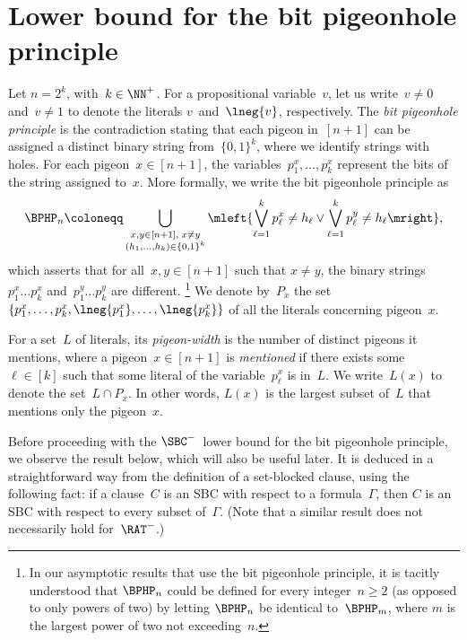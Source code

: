 \documentclass[12pt]{article}
\begin{document}
\section{Lower bound for the bit pigeonhole principle}
\label{sec:lower-bound-for-BPHP}

Let $n = 2^k$, with~$k \in \NN^+$.
For a propositional variable~$v$,
let us write~$v \neq 0$ and~$v \neq 1$
to denote the literals $v$~and~$\lneg{v}$, respectively.
The \emph{bit pigeonhole principle} is the contradiction stating that
each pigeon in~$[n + 1]$ can be assigned a distinct binary string from~$\{0,1\}^k$,
where we identify strings with holes.
For each pigeon~$x \in [n + 1]$, the variables~$p^x_1, \dots, p^x_k$
represent the bits of the string assigned to~$x$.
More formally, we write the bit pigeonhole principle as
\begin{equation*}
  \BPHP_n \coloneqq
  \bigcup_{\substack{x, y \in [n + 1],\; x \neq y \\ (h_1, \dots, h_k) \in \{0, 1\}^k}}
  \mleft\{\bigvee_{\ell = 1}^k p^x_\ell \neq h_\ell
  \lor \bigvee_{\ell = 1}^k p^y_\ell \neq h_\ell \mright\},
\end{equation*}
which asserts that for all~$x, y \in [n + 1]$ such that $x \neq y$,
the binary strings~$p^x_1 \dots p^x_k$ and~$p^y_1 \dots p^y_k$ are different.%
\footnote{In our asymptotic results that use the bit pigeonhole principle,
  it is tacitly understood that $\BPHP_n$ could be defined for every integer~$n \geq 2$
  (as opposed to only powers of two) by letting $\BPHP_n$ be identical to~$\BPHP_m$,
  where $m$ is the largest power of two not exceeding~$n$.}
We denote by~$P_x$ the set~$\{p^x_1, \dots, p^x_k,
\lneg{p^x_1}, \dots, \lneg{p^x_k}\}$ of all the literals concerning pigeon~$x$.

For a set~$L$ of literals,
its \emph{pigeon-width} is the number of distinct pigeons it mentions,
where a pigeon~$x \in [n + 1]$ is \emph{mentioned} if there exists some~$\ell \in [k]$
such that some literal of the variable~$p^x_\ell$ is in~$L$.
We write~$L(x)$ to denote the set~$L \cap P_x$.
In other words, $L(x)$ is the largest subset of~$L$ that mentions only the pigeon~$x$.

Before proceeding with the $\SBC^-$~lower bound for the bit pigeonhole principle,
we observe the result below, which will also be useful later.
It is deduced in a straightforward way
from the definition of a set-blocked clause,
using the following fact:
if a clause~$C$ is an SBC with respect to a formula~$\Gamma$,
then $C$ is an SBC with respect to every subset of~$\Gamma$.
(Note that a similar result does not necessarily hold for~$\RAT^-$.)
\end{document}
